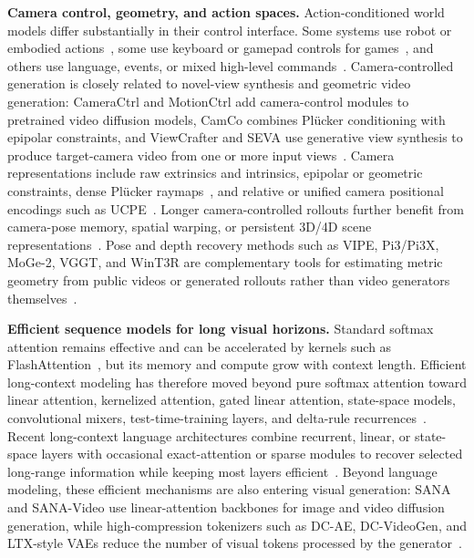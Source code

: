 \documentclass{llmxive}
\begin{document}
\noindent\textbf{Camera control, geometry, and action spaces.}
Action-conditioned world models differ substantially in their control interface.
Some systems use robot or embodied actions~\citep{dreamzero,dreamdojo}, some use keyboard or gamepad controls for games~\citep{genie3,gamegen,matrixgame,matrixgame3}, and others use language, events, or mixed high-level commands~\citep{unisim,yume}.
Camera-controlled generation is closely related to novel-view synthesis and geometric video generation: CameraCtrl and MotionCtrl add camera-control modules to pretrained video diffusion models, CamCo combines Pl\"ucker conditioning with epipolar constraints, and ViewCrafter and SEVA use generative view synthesis to produce target-camera video from one or more input views~\citep{cameractrl,motionctrl,camco,viewcrafter,seva}.
Camera representations include raw extrinsics and intrinsics, epipolar or geometric constraints, dense Pl\"ucker raymaps~\citep{plucker_lfn}, and relative or unified camera positional encodings such as UCPE~\citep{ucpe,li2025cameras}.
Longer camera-controlled rollouts further benefit from camera-pose memory, spatial warping, or persistent 3D/4D scene representations~\citep{aether,ucm,worldcam,captain_safari,deepverse,versecrafter,hy_world2,inspatio_world}.
Pose and depth recovery methods such as VIPE, Pi3/Pi3X, MoGe-2, VGGT, and WinT3R are complementary tools for estimating metric geometry from public videos or generated rollouts rather than video generators themselves~\citep{vipe,pi3x,moge2,vggt,wint3r}.

\noindent\textbf{Efficient sequence models for long visual horizons.}
Standard softmax attention remains effective and can be accelerated by kernels such as FlashAttention~\citep{flash_attention2}, but its memory and compute grow with context length.
Efficient long-context modeling has therefore moved beyond pure softmax attention toward linear attention, kernelized attention, gated linear attention, state-space models, convolutional mixers, test-time-training layers, and delta-rule recurrences~\citep{linear_attention,performer,gla,rwkv,retnet,hyena,mamba,mamba2,ttt_layers,gated_deltanet}.
Recent long-context language architectures combine recurrent, linear, or state-space layers with occasional exact-attention or sparse modules to recover selected long-range information while keeping most layers efficient~\citep{qwen3,qwen3_next,kimi_linear,kimi_k2}.
Beyond language modeling, these efficient mechanisms are also entering visual generation: SANA and SANA-Video use linear-attention backbones for image and video diffusion generation, while high-compression tokenizers such as DC-AE, DC-VideoGen, and LTX-style VAEs reduce the number of visual tokens processed by the generator~\citep{sana,chen2025sana,dc_ae,dc-video-gen,ltx_video,ltx2}.
\end{document}
